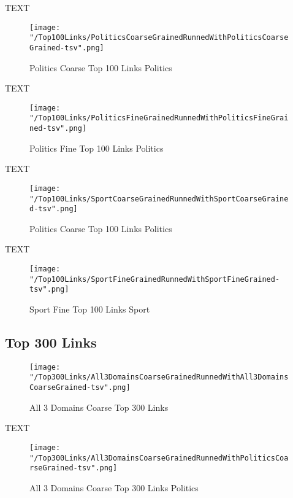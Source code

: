 \documentclass[thesis=M,english]{FITthesis}[2018/05/30]
\begin{document}
	TEXT

	\begin{figure}\centering
		\texttt{[image: "/Top100Links/PoliticsCoarseGrainedRunnedWithPoliticsCoarseGrained-tsv".png]}
		\caption{Politics Coarse Top 100 Links Politics}\label{}
	\end{figure}	

	TEXT	

	\begin{figure}\centering
		\texttt{[image: "/Top100Links/PoliticsFineGrainedRunnedWithPoliticsFineGrained-tsv".png]}
		\caption{Politics Fine Top 100 Links Politics}\label{}
	\end{figure}

	
	TEXT

	\begin{figure}\centering
		\texttt{[image: "/Top100Links/SportCoarseGrainedRunnedWithSportCoarseGrained-tsv".png]}
		\caption{Politics Coarse Top 100 Links Politics}\label{}
	\end{figure}		
	
		TEXT	

	\begin{figure}\centering
		\texttt{[image: "/Top100Links/SportFineGrainedRunnedWithSportFineGrained-tsv".png]}
		\caption{Sport Fine Top 100 Links Sport}\label{}	
	\end{figure}

\subsection{Top 300 Links}

	\begin{figure}\centering
		\texttt{[image: "/Top300Links/All3DomainsCoarseGrainedRunnedWithAll3DomainsCoarseGrained-tsv".png]}
		\caption{All 3 Domains Coarse Top 300 Links}\label{}
	\end{figure}

	TEXT

	\begin{figure}\centering
		\texttt{[image: "/Top300Links/All3DomainsCoarseGrainedRunnedWithPoliticsCoarseGrained-tsv".png]}
		\caption{All 3 Domains Coarse Top 300 Links Politics}\label{}
	\end{figure}	
\end{document}
